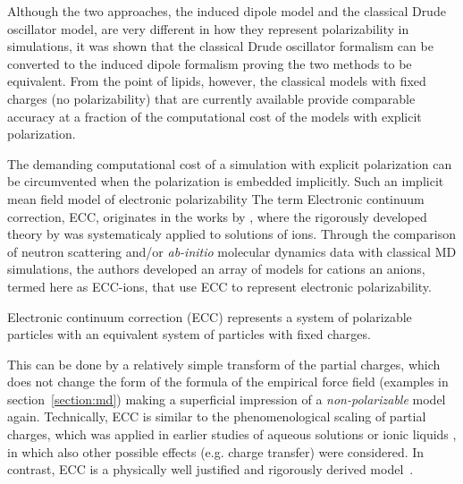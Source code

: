 Although the two approaches, 
the induced dipole model and the classical Drude oscillator model, 
are very different in how they represent polarizability in simulations,
it was shown that the classical Drude oscillator formalism can be converted to the induced dipole formalism 
proving the two methods to be equivalent. \citep{huang2017mapping}
From the point of lipids, however, the classical models with fixed charges (no polarizability) that are currently available 
provide comparable accuracy at a fraction of the computational cost of the models with explicit polarization. \cite{lucas12,chowdhary13} 

The demanding computational cost of a simulation with explicit polarization can be circumvented when the polarization is embedded implicitly. 
Such an implicit mean field model of electronic polarizability 
The term Electronic continuum correction, ECC, originates in the works by \citet{Pluharova2014, kohagen14, kohagen16, martinek17},
where the rigorously developed theory by \citet{leontyev14} was systematicaly applied to solutions of ions.
Through the comparison of neutron scattering and/or \emph{ab-initio} molecular dynamics data with classical MD simulations, 
the authors developed an array of models for cations an anions, termed here as ECC-ions,
that use ECC to represent electronic polarizability. 

Electronic continuum correction (ECC) 
represents a system of polarizable particles 
with an equivalent system of particles with fixed charges. \citep{leontyev09, leontyev10, leontyev11, leontyev14}

This can be done by a relatively simple transform of the partial charges,
which does not change the form of the formula of the empirical force field (examples in section~\ref{section:md})
making a superficial impression of a \emph{non-polarizable} model again. 
Technically, ECC is similar to the phenomenological scaling of partial charges, 
which was applied in earlier studies of aqueous solutions or ionic liquids \citep{jonsson86,egberts94,beichel14},
in which also other possible effects (e.g. charge transfer) were considered.
In contrast, ECC is a physically well justified and rigorously derived model~\citep{leontyev09, leontyev10, leontyev11, leontyev14}.

